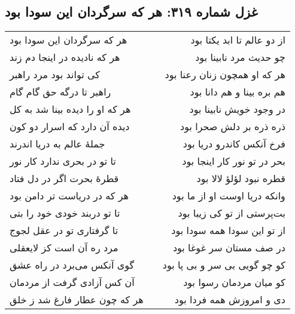 \begin{center}
\section*{غزل شماره ۳۱۹: هر که سرگردان این سودا بود}
\label{sec:319}
\begin{longtable}{l p{0.5cm} r}
هر که سرگردان این سودا بود
&&
از دو عالم تا ابد یکتا بود
\\
هر که نادیده در اینجا دم زند
&&
چو حدیث مرد نابینا بود
\\
کی تواند بود مرد راهبر
&&
هر که او همچون زنان رعنا بود
\\
راهبر تا درگه حق گام گام
&&
هم بره بینا و هم دانا بود
\\
هر که او را دیده بینا شد به کل
&&
در وجود خویش نابینا بود
\\
دیده آن دارد که اسرار دو کون
&&
ذره ذره بر دلش صحرا بود
\\
جملهٔ عالم به دریا اندرند
&&
فرخ آنکس کاندرو دریا بود
\\
تا تو در بحری ندارد کار نور
&&
بحر در تو نور کار اینجا بود
\\
قطرهٔ بحرت اگر در دل فتاد
&&
قطره نبود لؤلؤ لالا بود
\\
هر که در دریاست تر دامن بود
&&
وانکه دریا اوست او از ما بود
\\
تا تو دربند خودی خود را بتی
&&
بت‌پرستی از تو کی زیبا بود
\\
تا گرفتاری تو در عقل لجوج
&&
از تو این سودا همه سودا بود
\\
مرد ره آن است کز لایعقلی
&&
در صف مستان سر غوغا بود
\\
گوی آنکس می‌برد در راه عشق
&&
کو چو گویی بی سر و بی پا بود
\\
آن کس آزادی گرفت از مردمان
&&
کو میان مردمان رسوا بود
\\
هر که چون عطار فارغ شد ز خلق
&&
دی و امروزش همه فردا بود
\\
\end{longtable}
\end{center}
